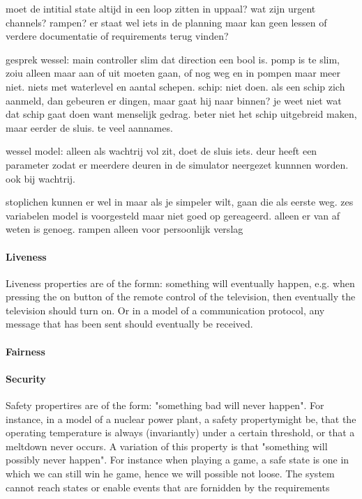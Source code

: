 moet de intitial state altijd in een loop zitten in uppaal?
wat zijn urgent channels?
rampen? er staat wel iets in de planning maar kan geen lessen of verdere documentatie of requirements terug vinden?	


gesprek wessel:
main controller slim dat direction een bool is. 
pomp is te slim, zoiu alleen maar aan of uit moeten gaan, of nog weg en in pompen maar meer niet. niets met waterlevel en aantal schepen.
schip: niet doen. als een schip zich aanmeld, dan gebeuren er dingen, maar gaat hij naar binnen? je weet niet wat dat schip gaat doen want menselijk gedrag. beter niet het schip uitgebreid maken, maar eerder de sluis. te veel aannames.

wessel model: alleen als wachtrij vol zit, doet de sluis iets.
deur heeft een parameter zodat er meerdere deuren in de simulator neergezet kunnnen worden. ook bij wachtrij.

stoplichen kunnen er wel in maar als je simpeler wilt, gaan die als eerste weg.
zes variabelen model is voorgesteld maar niet goed op gereageerd. alleen er van af weten is genoeg.
rampen alleen voor persoonlijk verslag

 


 

\paragraph{Liveness}
Liveness properties are of the formn: something will eventually happen, e.g. when pressing the on button of the remote control of the television, then eventually the television should turn on. Or in a model of a  communication protocol, any message that has been sent should eventually be received.
\paragraph{Fairness}
\paragraph{Security}
Safety propertires are of the form: "something bad will never happen". For instance, in a model of a nuclear power plant, a safety propertymight be, that the operating temperature is always (invariantly) under a certain threshold, or that a meltdown never occurs. A variation of this property is that "something will possibly never happen".
 For instance when playing a game, a safe state is one in which we can still win he game, hence we will possible not loose.
The system cannot reach states or enable events that are fornidden by the requirements
